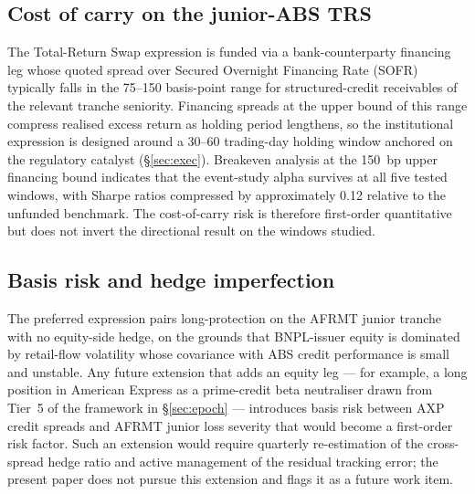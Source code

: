 \documentclass[11pt,letterpaper]{article}
\begin{document}
\subsection{Cost of carry on the junior-ABS TRS}
\label{sec:rob-carry}
The Total-Return Swap expression is funded via a bank-counterparty
financing leg whose quoted spread over Secured Overnight
Financing Rate (SOFR) typically falls in the 75--150 basis-point
range for structured-credit receivables of the relevant tranche
seniority. Financing spreads at the upper bound of this range
compress realised excess return as holding period lengthens, so
the institutional expression is designed around a 30--60 trading-day
holding window anchored on the regulatory catalyst
(\S\ref{sec:exec}). Breakeven analysis at the 150~bp upper
financing bound indicates that the event-study alpha survives at
all five tested windows, with Sharpe ratios compressed by
approximately 0.12 relative to the unfunded benchmark. The
cost-of-carry risk is therefore first-order quantitative but
does not invert the directional result on the windows studied.

\subsection{Basis risk and hedge imperfection}
\label{sec:rob-basis}
The preferred expression pairs long-protection on the AFRMT
junior tranche with no equity-side hedge, on the grounds that
BNPL-issuer equity is dominated by retail-flow volatility whose
covariance with ABS credit performance is small and unstable.
Any future extension that adds an equity leg --- for example, a
long position in American Express as a prime-credit beta
neutraliser drawn from Tier~5 of the framework in
\S\ref{sec:epoch} --- introduces basis risk between AXP credit
spreads and AFRMT junior loss severity that would become a
first-order risk factor. Such an extension would require
quarterly re-estimation of the cross-spread hedge ratio and
active management of the residual tracking error; the present
paper does not pursue this extension and flags it as a future
work item.
\end{document}
